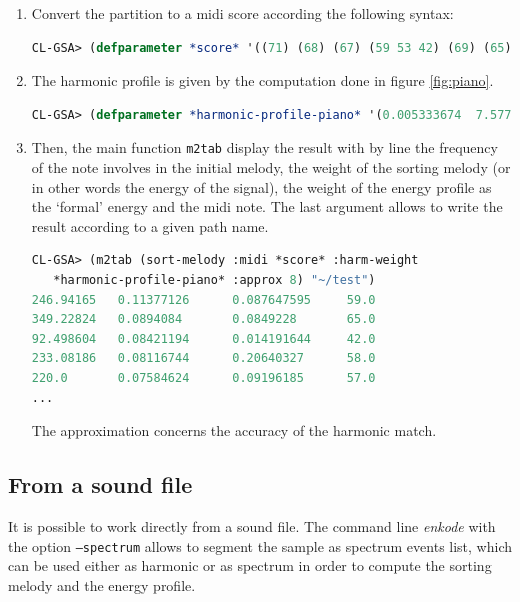 \begin{enumerate}
\item 
Convert the partition to a midi score according the following syntax:
\begin{lstlisting}[language=Lisp]
CL-GSA> (defparameter *score* '((71) (68) (67) (59 53 42) (69) (65) (65) (61 57 46) (64) (60 64) (58) (67 59 50 42) (54) (57) (58) (59)))
\end{lstlisting}

\item
The harmonic profile is given by the computation done in figure \ref{fig:piano}.

\begin{lstlisting}[language=Lisp]
CL-GSA> (defparameter *harmonic-profile-piano* '(0.005333674  7.5771334e-4  0.0011644672 1.3338796e-4 7.3244237e-6  7.2097446e-6  2.3828345e-6  4.374403e-6 4.064216e-6  1.18368014e-4  4.6414575e-6  5.292382e-6 2.4746847e-5))
\end{lstlisting}

\item
Then, the main function \texttt{m2tab} display the result with by line the frequency of the note involves in the initial melody, the weight of the sorting melody (or in other words the energy of the signal), the weight of the energy profile as the `formal' energy and the midi note. The last argument allows to write the result according to a given path name.   

\begin{lstlisting}[language=Lisp]
CL-GSA> (m2tab (sort-melody :midi *score* :harm-weight
   *harmonic-profile-piano* :approx 8) "~/test")
246.94165   0.11377126      0.087647595     59.0
349.22824   0.0894084       0.0849228       65.0
92.498604   0.08421194      0.014191644     42.0
233.08186   0.08116744      0.20640327      58.0
220.0       0.07584624      0.09196185      57.0
...
\end{lstlisting}

The approximation concerns the accuracy of the harmonic match.
\end{enumerate}

\subsection{From a sound file}

It is possible to work directly from a sound file. The command line \textsl{enkode} with the option \texttt{--spectrum} allows to segment the sample as spectrum events list, which can be used either as harmonic or as spectrum in order to compute the sorting melody and the energy profile. 


